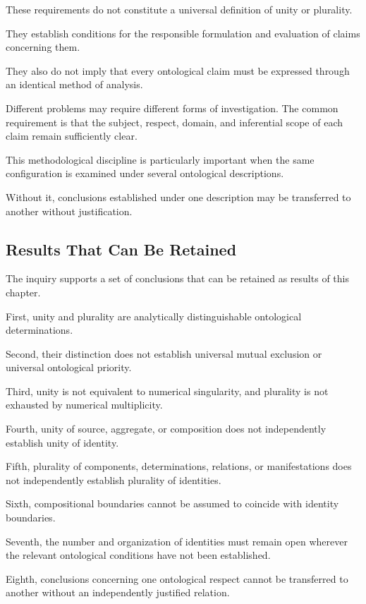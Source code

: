 These requirements do not
constitute a universal definition
of unity or plurality.

They establish conditions
for the responsible formulation
and evaluation of claims
concerning them.

They also do not imply that
every ontological claim must
be expressed through an identical
method of analysis.

Different problems may require
different forms of investigation.
The common requirement is that
the subject, respect, domain,
and inferential scope of each
claim remain sufficiently clear.

This methodological discipline
is particularly important when
the same configuration is
examined under several ontological
descriptions.

Without it, conclusions
established under one description
may be transferred to another
without justification.

\subsection{Results That Can Be Retained}

The inquiry supports a set
of conclusions that can be
retained as results of this
chapter.

First, unity and plurality
are analytically distinguishable
ontological determinations.

Second, their distinction
does not establish universal
mutual exclusion or universal
ontological priority.

Third, unity is not equivalent
to numerical singularity,
and plurality is not exhausted
by numerical multiplicity.

Fourth, unity of source,
aggregate, or composition
does not independently establish
unity of identity.

Fifth, plurality of components,
determinations, relations,
or manifestations does not
independently establish
plurality of identities.

Sixth, compositional boundaries
cannot be assumed to coincide
with identity boundaries.

Seventh, the number and
organization of identities
must remain open wherever
the relevant ontological
conditions have not been
established.

Eighth, conclusions concerning
one ontological respect cannot
be transferred to another
without an independently
justified relation.

